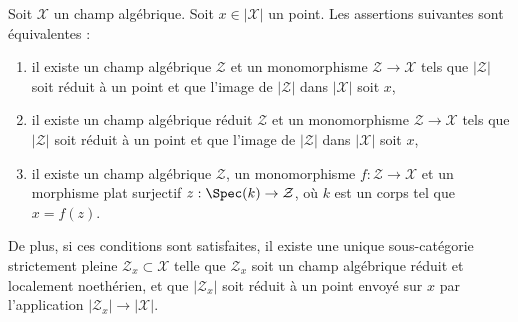 \begin{lemma}
\label{lemma-residual-gerbe}
Soit $\mathcal{X}$ un champ algébrique. Soit $x \in |\mathcal{X}|$ un point.
Les assertions suivantes sont équivalentes :
\begin{enumerate}
\item il existe un champ algébrique $\mathcal{Z}$ et un monomorphisme
$\mathcal{Z} \to \mathcal{X}$ tels que $|\mathcal{Z}|$ soit réduit à un point
et que l'image de $|\mathcal{Z}|$ dans $|\mathcal{X}|$ soit $x$,
\item il existe un champ algébrique réduit $\mathcal{Z}$ et un monomorphisme
$\mathcal{Z} \to \mathcal{X}$ tels que $|\mathcal{Z}|$ soit réduit à un point
et que l'image de $|\mathcal{Z}|$ dans $|\mathcal{X}|$ soit $x$,
\item il existe un champ algébrique $\mathcal{Z}$, un monomorphisme
$f : \mathcal{Z} \to \mathcal{X}$ et un morphisme plat surjectif
$z : \Spec(k) \to \mathcal{Z}$, où $k$ est un corps tel que
$x = f(z)$.
\end{enumerate}
De plus, si ces conditions sont satisfaites, il existe une unique
sous-catégorie strictement pleine $\mathcal{Z}_x \subset \mathcal{X}$
telle que $\mathcal{Z}_x$ soit un champ algébrique réduit et localement
noethérien, et que $|\mathcal{Z}_x|$ soit réduit à un point envoyé sur $x$
par l'application $|\mathcal{Z}_x| \to |\mathcal{X}|$.
\end{lemma}

